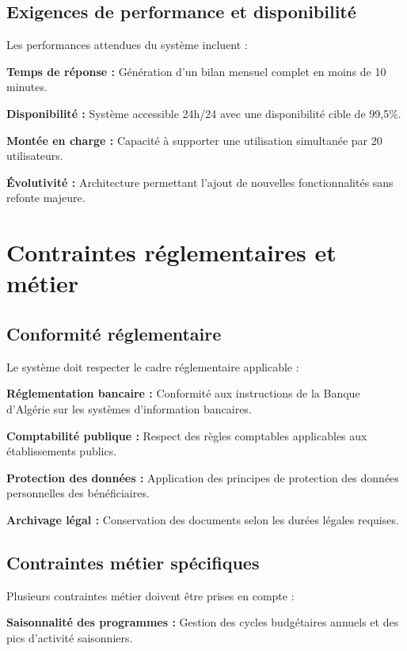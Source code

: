 \subsection{Exigences de performance et disponibilité}

Les performances attendues du système incluent :

\medskip

\textbf{Temps de réponse :} Génération d'un bilan mensuel complet en moins de 10 minutes.

\textbf{Disponibilité :} Système accessible 24h/24 avec une disponibilité cible de 99,5\%.

\textbf{Montée en charge :} Capacité à supporter une utilisation simultanée par 20 utilisateurs.

\textbf{Évolutivité :} Architecture permettant l'ajout de nouvelles fonctionnalités sans refonte majeure.

\section{Contraintes réglementaires et métier}

\subsection{Conformité réglementaire}

Le système doit respecter le cadre réglementaire applicable :

\medskip

\textbf{Réglementation bancaire :} Conformité aux instructions de la Banque d'Algérie sur les systèmes d'information bancaires.

\textbf{Comptabilité publique :} Respect des règles comptables applicables aux établissements publics.

\textbf{Protection des données :} Application des principes de protection des données personnelles des bénéficiaires.

\textbf{Archivage légal :} Conservation des documents selon les durées légales requises.

\subsection{Contraintes métier spécifiques}

Plusieurs contraintes métier doivent être prises en compte :

\medskip

\textbf{Saisonnalité des programmes :} Gestion des cycles budgétaires annuels et des pics d'activité saisonniers.


